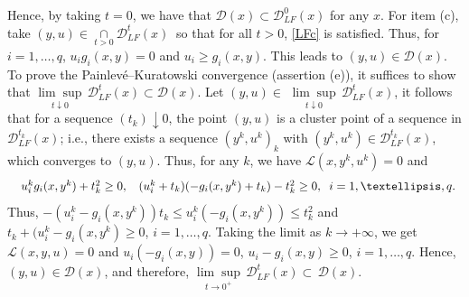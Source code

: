 Hence, by taking $t=0$, we have that $\mathcal{D}(x)\subset \mathcal{D}_{LF}^{0}(x) $ for any $x$.
    	 For item (c), take $(y,u)\in \underset{t>0}{\cap}\mathcal{D}_{LF}^{t}(x)\ $ so that for all $t>0$, \eqref{LFc} is satisfied. Thus, for $i=1, \ldots, q$,  $u_{i}g_{i}(x,y)=0$ and $u_{i}\geq g_{i}(x,y)$. This leads to $(y,u)\in \mathcal{D}(x)$.
	To prove the Painlev\'{e}--Kuratowski convergence (assertion (e)), it suffices to show that $\underset{t\downarrow0}{\lim\sup}\,\mathcal{D}^{t}_{LF}(x) \subset \mathcal{D}(x)$. Let $(y,u)\in$ $\underset{t\downarrow0}{\lim\sup}\,\mathcal{D}^{t}_{LF}(x)$, it follows that
	for a sequence $(t_{k})\downarrow0$, the point $(y,u)$ is a cluster point of a sequence
	in $\mathcal{D}^{t_{k}}_{LF}(x)$; i.e., there exists a sequence $(y^{k}
	,u^{k})_{k}$ with $(y^{k},u^{k})\in\mathcal{D}^{t_{k}}_{LF}(x)$, which converges
	to $(y,u)$. Thus, for any $k$, we have $\mathcal{L}(x,y^{k},u^{k})=0$ and
	\[
	\begin{array}
	[c]{l}
	\;\; u_{i}^{k}g_{i}(x,y^{k})+t_{k}^{2}\geq0,\text{ } \;\;
	(u_{i}^{k}+t_{k})(-g_{i}(x,y^{k})+t_{k})-t^{2}_{k}\geq 0 , \;\; i=1,\ldots,q.
	\end{array}
	\]
	Thus, 
	$-(u_{i}^{k}-g_{i}(x,y^{k}))t_{k}\leq u_{i}^{k}(-g_{i}(x,y^{k}))\leq t_{k}^{2}$ and $t_{k}+(u_{i}^{k}-g_{i}(x,y^{k})\geq 0$, $i=1,\ldots,q$.
	Taking the limit as $k\rightarrow{+\infty}$, we get $\mathcal{L}(x,y,u)=0$ and
    $u_{i}(-g_{i}(x,y))=0$, $u_{i}-g_{i}(x,y)\geq 0$, $i=1,\ldots,q$. Hence, $(y,u)\in\mathcal{D}(x)$, and therefore,  $\underset
	{t\rightarrow0^{+}}{\lim\sup}\,\mathcal{D}^{t}_{LF}(x)\subset\,\mathcal{D}(x).$ %





